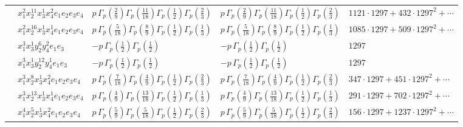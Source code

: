 \documentclass[11pt]{article}
\begin{document}
\begin{table}[ht]
{\begin{tabular}{@{}lllll@{}}
 & $x_{1}^{2} x_{2}^{11} x_{3}^{1} x_{4}^{2}  e_{1} e_{2} e_{3} e_{4}$ & $p \, \Gamma_p \left( \frac{2}{9} \right) \Gamma_p \left( \frac{11}{18} \right) \Gamma_p \left( \frac{1}{2} \right) \Gamma_p \left( \frac{2}{3} \right)$ & $p \, \Gamma_p \left( \frac{2}{9} \right) \Gamma_p \left( \frac{11}{18} \right) \Gamma_p \left( \frac{1}{2} \right) \Gamma_p \left( \frac{2}{3} \right)$ & $1121{\cdot}1297{+}432{\cdot}1297^{2}{+}\cdots$ \\
 & $x_{1}^{2} x_{2}^{16} x_{3}^{1} x_{4}^{1}  e_{1} e_{2} e_{3} e_{4}$ & $p \, \Gamma_p \left( \frac{5}{18} \right) \Gamma_p \left( \frac{8}{9} \right) \Gamma_p \left( \frac{1}{2} \right) \Gamma_p \left( \frac{1}{3} \right)$ & $p \, \Gamma_p \left( \frac{5}{18} \right) \Gamma_p \left( \frac{8}{9} \right) \Gamma_p \left( \frac{1}{2} \right) \Gamma_p \left( \frac{1}{3} \right)$ & $1085{\cdot}1297{+}509{\cdot}1297^{2}{+}\cdots$ \\
 & $x_{1}^{3} x_{3}^{1} y_{2}^{6} y_{4}^{2} e_{1} e_{3}$ & $- p \, \Gamma_p \left( \frac{1}{2} \right) \Gamma_p \left( \frac{1}{2} \right)$ & $- p \, \Gamma_p \left( \frac{1}{2} \right) \Gamma_p \left( \frac{1}{2} \right)$ & $1297$ \\
 & $x_{1}^{3} x_{3}^{1} y_{2}^{12} y_{4}^{1} e_{1} e_{3}$ & $- p \, \Gamma_p \left( \frac{1}{2} \right) \Gamma_p \left( \frac{1}{2} \right)$ & $- p \, \Gamma_p \left( \frac{1}{2} \right) \Gamma_p \left( \frac{1}{2} \right)$ & $1297$ \\
 & $x_{1}^{3} x_{2}^{8} x_{3}^{1} x_{4}^{2}  e_{1} e_{2} e_{3} e_{4}$ & $p \, \Gamma_p \left( \frac{7}{18} \right) \Gamma_p \left( \frac{4}{9} \right) \Gamma_p \left( \frac{1}{2} \right) \Gamma_p \left( \frac{2}{3} \right)$ & $p \, \Gamma_p \left( \frac{7}{18} \right) \Gamma_p \left( \frac{4}{9} \right) \Gamma_p \left( \frac{1}{2} \right) \Gamma_p \left( \frac{2}{3} \right)$ & $347{\cdot}1297{+}451{\cdot}1297^{2}{+}\cdots$ \\
 & $x_{1}^{3} x_{2}^{13} x_{3}^{1} x_{4}^{1}  e_{1} e_{2} e_{3} e_{4}$ & $p \, \Gamma_p \left( \frac{4}{9} \right) \Gamma_p \left( \frac{13}{18} \right) \Gamma_p \left( \frac{1}{2} \right) \Gamma_p \left( \frac{1}{3} \right)$ & $p \, \Gamma_p \left( \frac{4}{9} \right) \Gamma_p \left( \frac{13}{18} \right) \Gamma_p \left( \frac{1}{2} \right) \Gamma_p \left( \frac{1}{3} \right)$ & $291{\cdot}1297{+}702{\cdot}1297^{2}{+}\cdots$ \\
 & $x_{1}^{4} x_{2}^{5} x_{3}^{1} x_{4}^{2}  e_{1} e_{2} e_{3} e_{4}$ & $p \, \Gamma_p \left( \frac{5}{9} \right) \Gamma_p \left( \frac{5}{18} \right) \Gamma_p \left( \frac{1}{2} \right) \Gamma_p \left( \frac{2}{3} \right)$ & $p \, \Gamma_p \left( \frac{5}{9} \right) \Gamma_p \left( \frac{5}{18} \right) \Gamma_p \left( \frac{1}{2} \right) \Gamma_p \left( \frac{2}{3} \right)$ & $156{\cdot}1297{+}1237{\cdot}1297^{2}{+}\cdots$ \\

\end{tabular}}
\end{table}
\end{document}
